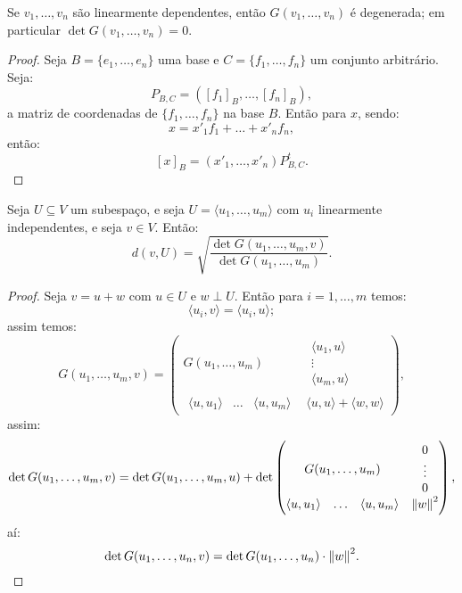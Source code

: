 \documentclass[11pt,twoside,a4paper]{book}
\begin{document}
\begin{proposicao}
Se $v_1,\dots,v_n$ são linearmente dependentes, então $G(v_1,\dots,v_n)$ é degenerada; em particular $\det G(v_1,\dots,v_n)=0$.
\end{proposicao}
\begin{proof}
Seja $B=\{e_1,\dots,e_n\}$ uma base e $C=\{f_1,\dots,f_n\}$ um conjunto arbitrário. Seja:
\[
P_{B,C}=\left([f_1]_B,\dots,[f_n]_B\right),
\]
a matriz de coordenadas de $\{f_1,\dots,f_n\}$ na base $B$. Então para $x$, sendo:
\[
x=x'_1f_1+\dots+x'_nf_n,
\]
então:
\[
[x]_B=\left(x'_1,\dots,x'_n\right)P^t_{B,C}.
\]
\end{proof}

\begin{proposicao}
Seja $U\subseteq V$ um subespaço, e seja $U=\langle u_1,\dots,u_m\rangle$ com $u_i$ linearmente independentes, e seja $v\in V$. Então:
\[
d(v,U)=\sqrt{\frac{\det G(u_1,\dots,u_m,v)}{\det G(u_1,\dots,u_m)}}.
\]
\end{proposicao}
\begin{proof}
Seja $v=u+w$ com $u\in U$ e $w\perp U$. Então para $i=1,\dots,m$ temos:
\[
\langle u_i,v\rangle=\langle u_i,u\rangle;
\]
assim temos:
\[
G(u_1,\dots,u_m,v)=\begin{pmatrix}
G(u_1,\dots,u_m)&\begin{matrix}\langle u_1,u\rangle\\\vdots\\\langle u_m,u\rangle\end{matrix}\\\begin{matrix}\langle u,u_1\rangle&\ldots&\langle u,u_m\rangle\end{matrix}&\langle u,u\rangle+\langle w,w\rangle
\end{pmatrix},
\]
assim:
\[
\det G(u_1,\dots,u_m,v)=\det G(u_1,\dots,u_m,u)+\det\begin{pmatrix}
G(u_1,\dots,u_m)&\begin{matrix}0\\\vdots\\0\end{matrix}\\\begin{matrix}\langle u,u_1\rangle&\ldots&\langle u,u_m\rangle\end{matrix}&\norm{w}^2
\end{pmatrix},
\]
aí:
\[
\det G(u_1,\dots,u_n,v)=\det G(u_1,\dots,u_n)\cdot\norm{w}^2.
\]
\end{proof}
\end{document}
